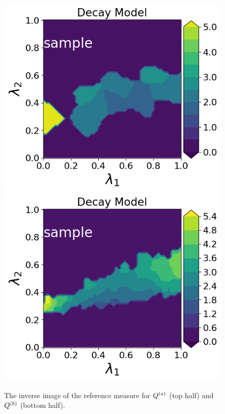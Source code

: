 \begin{figure}[h]
\begin{minipage}{.4\textwidth}
\includegraphics[width=\linewidth]{examples/fig_decay_q2/DecayModel--sample_N50_mc.png}
\includegraphics[width=\linewidth]{examples/fig_decay_q2/DecayModel--sample_N500_mc.png}
\end{minipage}

\caption{The inverse image of the reference measure for $Q^{(a)}$ (top half) and $Q^{(b)}$ (bottom half). }
\label{fig:decay-convergence}
\end{figure}

